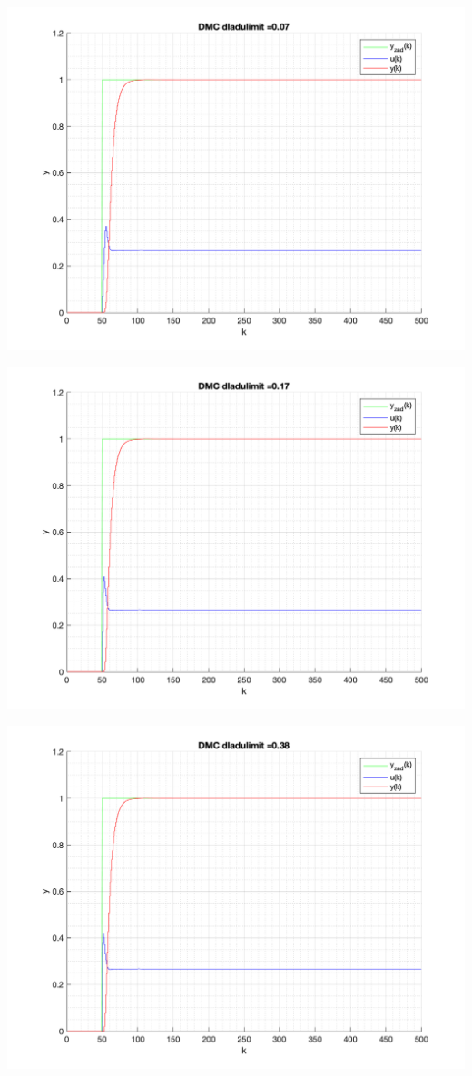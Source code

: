 \documentclass[a4paper, 11pt]{article}
\begin{document}
\begin{enumerate}
 \includegraphics[width=\linewidth]{./ModelsP6_dulimit/P4_DMC_dulimit_0_07_png.png} 
 
 \includegraphics[width=\linewidth]{./ModelsP6_dulimit/P4_DMC_dulimit_0_17_png.png} 
 
 \includegraphics[width=\linewidth]{./ModelsP6_dulimit/P4_DMC_dulimit_0_38_png.png} 
 

\end{enumerate}
\end{document}
